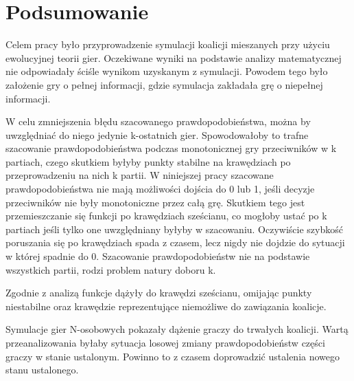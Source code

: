 \chapter{Podsumowanie}
\label{cha:podsumowanie}

Celem pracy było przyprowadzenie symulacji koalicji mieszanych przy użyciu ewolucyjnej teorii gier. Oczekiwane wyniki na podstawie analizy matematycznej nie odpowiadały ściśle wynikom uzyskanym z symulacji. Powodem tego było założenie gry o pełnej informacji, gdzie symulacja zakładała grę o niepełnej informacji. 

W celu zmniejszenia błędu szacowanego prawdopodobieństwa, można by uwzględniać do niego jedynie k-ostatnich gier. Spowodowałoby to trafne szacowanie prawdopodobieństwa podczas monotonicznej gry przeciwników w k partiach, czego skutkiem byłyby punkty stabilne na krawędziach po przeprowadzeniu na nich k partii. W niniejszej pracy szacowane prawdopodobieństwa nie mają możliwości dojścia do 0 lub 1, jeśli decyzje przeciwników nie były monotoniczne przez całą grę. Skutkiem tego jest przemieszczanie się funkcji po krawędziach sześcianu, co mogłoby ustać po k partiach jeśli tylko one uwzględniany byłyby w szacowaniu. Oczywiście szybkość poruszania się po krawędziach spada z czasem, lecz nigdy nie dojdzie do sytuacji w której spadnie do 0. Szacowanie prawdopodobieństw nie na podstawie wszystkich partii, rodzi problem natury doboru k. 

Zgodnie z analizą funkcje dążyły do krawędzi sześcianu, omijając punkty niestabilne oraz krawędzie reprezentujące niemożliwe do zawiązania koalicje.

Symulacje gier N-osobowych pokazały dążenie graczy do trwałych koalicji. Wartą przeanalizowania byłaby sytuacja losowej zmiany prawdopodobieństw części graczy w stanie ustalonym. Powinno to z czasem doprowadzić ustalenia nowego stanu ustalonego.
